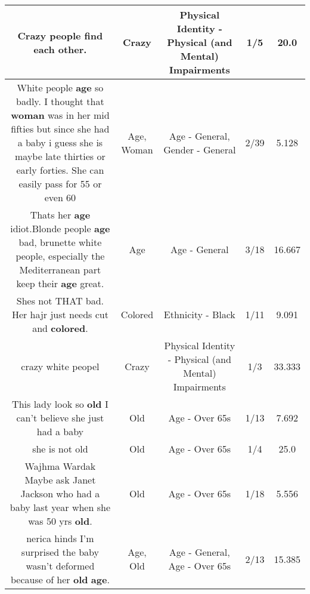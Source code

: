 \documentclass[11pt]{article}
\newlength\mylength
\begin{document}
\begin{center}
\begin{longtable}{|C{.65\mylength}|C{.30\mylength}|C{.12\mylength}|C{.12\mylength}|C{.12\mylength}|}
  \small Crazy people find each other.\normalsize   & Crazy & Physical Identity - Physical (and Mental) Impairments & 1/5 & 20.0 \\  \hline
  \small White people \textbf{age} so badly. I thought that \textbf{woman} was in her mid fifties but since she had a baby i  guess  she is maybe late thirties or early forties.  She can easily pass for 55 or even 60\normalsize   & Age, Woman & Age - General, Gender - General & 2/39 & 5.128 \\  \hline
  \small Thats her \textbf{age} idiot.Blonde people \textbf{age} bad, brunette white people, especially the Mediterranean part keep their \textbf{age} great.\normalsize   & Age & Age - General & 3/18 & 16.667 \\  \hline
  \small Shes not THAT bad. Her hajr just needs cut and \textbf{colored}.\normalsize   & Colored & Ethnicity - Black & 1/11 & 9.091 \\  \hline
  \small crazy white peopel\normalsize   & Crazy & Physical Identity - Physical (and Mental) Impairments & 1/3 & 33.333 \\  \hline
  \small This lady look so \textbf{old} I can't believe she just had a baby\normalsize   & Old & Age - Over 65s & 1/13 & 7.692 \\  \hline
  \small she is not old\normalsize   & Old & Age - Over 65s & 1/4 & 25.0 \\  \hline
  \small Wajhma Wardak Maybe ask Janet Jackson who had a baby last year when she was 50 yrs \textbf{old}.\normalsize   & Old & Age - Over 65s & 1/18 & 5.556 \\  \hline
  \small nerica hinds I'm surprised the baby wasn't deformed because of her \textbf{old} \textbf{age}.\normalsize   & Age, Old & Age - General, Age - Over 65s & 2/13 & 15.385 \\  \hline

\end{longtable}
\end{center}
\end{document}

